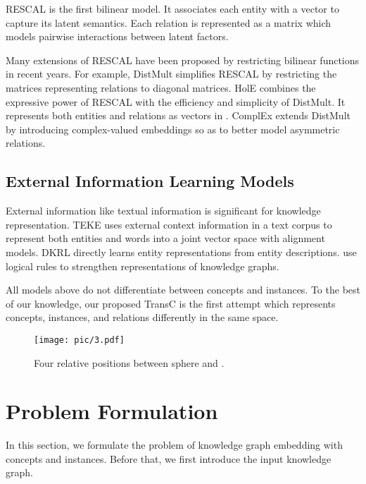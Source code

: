\documentclass[11pt,a4paper]{article}
\begin{document}
  RESCAL\cite{RESCAL} is the first bilinear model. It associates each entity with a vector to capture its latent semantics. 
  Each relation is represented as a matrix which models pairwise interactions between latent factors.
  
  Many extensions of RESCAL have been proposed by restricting bilinear functions in recent years.
  For example, DistMult \cite{DistMult} simplifies RESCAL by restricting the matrices representing relations to diagonal matrices.
  HolE\cite{HolE} combines the expressive power of RESCAL with the efficiency and simplicity of DistMult. 
  It represents both entities and relations as vectors in .
  ComplEx\cite{complEx} extends DistMult by introducing complex-valued embeddings so as to better model asymmetric relations.
   
  \subsection{External Information Learning Models} 
  
  External information like textual information is significant for knowledge representation.
  TEKE \cite{TEKE} uses external context information in a text corpus to represent both entities 
  and words into a joint vector space with alignment models. DKRL \cite{DKRL} directly learns entity 
  representations from entity descriptions. \cite{Wang2015Knowledge,Shu2016Jointly,Rockt2015Injecting} use logical rules to strengthen representations of knowledge graphs.
  
  All models above do not differentiate between concepts and instances. 
  To the best of our knowledge, our proposed TransC is the first attempt which represents concepts, instances, and relations differently in the same space.
  
  \begin{figure*}[ht] 
    \centering
    \setlength{\abovecaptionskip}{2pt}
    \setlength{\belowcaptionskip}{0pt}
    \texttt{[image: pic/3.pdf]}\\
    \caption{Four relative positions between sphere  and .}
    \label{four_position}
    \end{figure*}
   
  \section{Problem Formulation}
  
  In this section, we formulate the problem of knowledge graph embedding 
  with concepts and instances. Before that, we first introduce the input knowledge graph.
  
\end{document}
